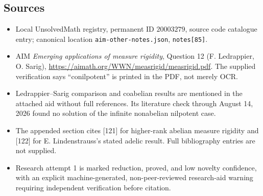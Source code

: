 \documentclass[11pt]{article}
\begin{document}
\subsection{Sources}
\begin{itemize}
\item Local UnsolvedMath registry, permanent ID $20003279$, source code catalogue entry; canonical location \texttt{aim-other-notes.json}, \texttt{notes[85]}.
\item AIM \emph{Emerging applications of measure rigidity}, Question 12 (F. Ledrappier, O. Sarig), \url{https://aimath.org/WWN/measrigid/measrigid.pdf}. The supplied verification says ``conilpotent'' is printed in the PDF, not merely OCR.
\item Ledrappier--Sarig comparison and coabelian results are mentioned in the attached aid without full references. Its literature check through August 14, 2026 found no solution of the infinite nonabelian nilpotent case.
\item The appended section cites [121] for higher-rank abelian measure rigidity and [122] for E. Lindenstrauss's stated adelic result. Full bibliography entries are not supplied.
\item Research attempt 1 is marked reduction, proved, and low novelty confidence, with an explicit machine-generated, non-peer-reviewed research-aid warning requiring independent verification before citation.
\end{itemize}
\end{document}
